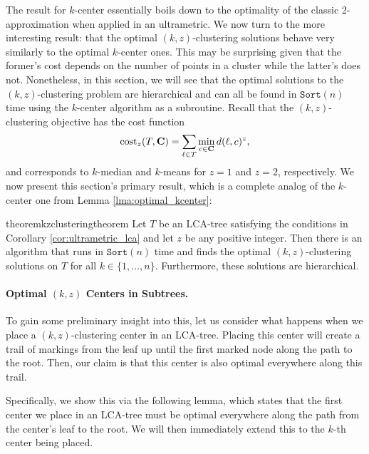 The result for $k$-center essentially boils down to the optimality of the classic 2-approximation when applied in an ultrametric. We now turn to the more
interesting result: that the optimal $(k, z)$-clustering solutions behave very similarly to the optimal $k$-center ones. This may be surprising given that the
former's cost depends on the number of points in a cluster while the latter's does not. Nonetheless, in this section, we will see that the optimal solutions to
the $(k, z)$-clustering problem are hierarchical and can all be found in $\texttt{Sort}(n)$ time using the $k$-center algorithm as a subroutine. Recall that the
$(k, z)$-clustering objective has the cost function \[ \text{cost}_z(T, \mathbf{C}) = \sum_{\ell \in T} \min_{c \in \mathbf{C}} d(\ell, c)^z, \] and corresponds to
$k$-median and $k$-means for $z=1$ and $z=2$, respectively. We now present this section's primary result, which is a complete analog of the $k$-center one from
Lemma \ref{lma:optimal_kcenter}:

\begin{restatable}{theorem}{kzclusteringtheorem}
    \label{thm:optimal_kz}
    Let $T$ be an LCA-tree satisfying the conditions in Corollary \ref{cor:ultrametric_lca} and let $z$ be any positive integer. Then there is an algorithm that
    runs in $\texttt{Sort}(n)$ time and finds the optimal $(k, z)$-clustering solutions on $T$ for all $k \in \{1, \ldots, n\}$. Furthermore, these solutions
    are hierarchical.
\end{restatable}


\paragraph{Optimal $(k, z)$ Centers in Subtrees.} To gain some preliminary insight into this, let us consider what happens when we place a $(k, z)$-clustering center in an LCA-tree. Placing this center will create a trail of markings from the leaf up until the first marked node along the path to the root. Then, our claim is that this center is also optimal everywhere along this trail.

Specifically, we show this via the following lemma, which states that the first center we place in an LCA-tree must be optimal everywhere along the path from the center's leaf to the root. We will then immediately extend this to the $k$-th center being placed.

